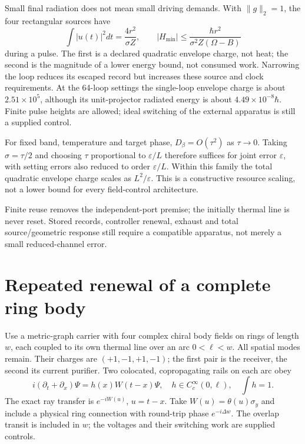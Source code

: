 Small final radiation does not mean small driving demands. With
$\|g\|_2=1$, the four rectangular sources have
\[
 \int|u(t)|^2dt=\frac{4r^2}{\sigma Z},\qquad
 |H_{\min}|\le\frac{\hbar r^2}{\sigma^2 Z(\Omega-B)}
\]
during a pulse. The first is a declared quadratic envelope charge, not
heat; the second is the magnitude of a lower energy bound, not consumed
work. Narrowing the loop reduces its escaped record but increases these
source and clock requirements. At the 64-loop settings the single-loop
envelope charge is about $2.51\times10^5$, although its unit-projector
radiated energy is about $4.49\times10^{-8}\hbar$.
Finite pulse heights are allowed; ideal switching of the external
apparatus is still a supplied control.

For fixed band, temperature and target phase, $D_\beta=O(\tau^2)$ as
$\tau\to0$. Taking $\sigma=\tau/2$ and choosing $\tau$ proportional
to $\varepsilon/L$ therefore suffices for joint error $\varepsilon$,
with setting errors also reduced to order $\varepsilon/L$.
Within this family the total quadratic envelope charge scales as
$L^2/\varepsilon$. This is a constructive resource scaling, not a
lower bound for every field-control architecture.

Finite reuse removes the independent-port premise; the initially
thermal line is never reset. Stored records, controller renewal,
exhaust and total source/geometric response still require a compatible
apparatus, not merely a small reduced-channel error.
\section{Repeated renewal of a complete ring body}
\label{sec:ring-renewal}

Use a metric-graph carrier with four complex chiral body fields on
rings of length $w$, each
coupled to its own thermal line over an arc $0<\ell<w$. All spatial
modes remain. Their charges are $(+1,-1,+1,-1)$; the first pair is the
receiver, the second its current purifier. Two colocated, copropagating
rails on each arc obey
\begin{equation}
 i(\partial_t+\partial_x)\Psi=h(x)W(t-x)\Psi,
 \quad h\in C_c^\infty(0,\ell),\quad\int h=1.
 \label{eq:ring-local-transfer}
\end{equation}
The exact ray transfer is $e^{-iW(u)}$, $u=t-x$. Take
$W(u)=\theta(u)\sigma_y$ and include a physical ring connection with
round-trip phase $e^{-i\Delta w}$. The overlap transit is included in
$w$; the voltages and their switching work are supplied controls.


